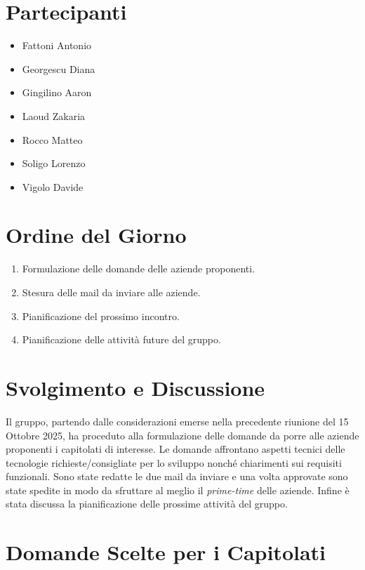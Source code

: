 \documentclass[a4paper,12pt]{article}
\begin{document}
\section{Partecipanti}
\begin{itemize}[noitemsep]
    \item Fattoni Antonio 
    \item Georgescu Diana
    \item Gingilino Aaron
    \item Laoud Zakaria
    \item Rocco Matteo
    \item Soligo Lorenzo
    \item Vigolo Davide
\end{itemize}

\section{Ordine del Giorno}
\begin{enumerate}
    \item Formulazione delle domande delle aziende proponenti.
    \item Stesura delle mail da inviare alle aziende.
    \item Pianificazione del prossimo incontro.
    \item Pianificazione delle attività future del gruppo.
\end{enumerate}
\vspace{0.5cm}
\section{Svolgimento e Discussione}
Il gruppo, partendo dalle considerazioni emerse nella precedente riunione del 15 Ottobre 2025, ha proceduto alla formulazione delle domande da porre alle aziende proponenti i capitolati di interesse.
Le domande affrontano aspetti tecnici delle tecnologie richieste/consigliate per lo sviluppo nonché chiarimenti sui requisiti funzionali.
Sono state redatte le due mail da inviare e una volta approvate sono state spedite in modo da sfruttare al meglio il \textit{prime-time} delle aziende.
Infine è stata discussa la pianificazione delle prossime attività del gruppo.

\vspace{0.5cm}
\section{Domande Scelte per i Capitolati}
\end{document}
